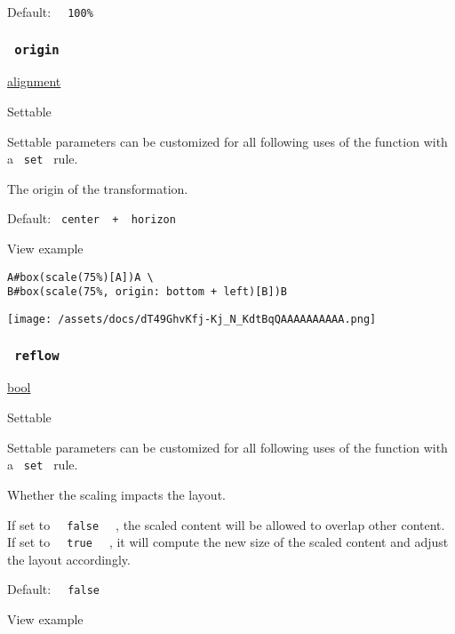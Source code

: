 Default: \texttt{\ }{\texttt{\ 100\%\ }}\texttt{\ }

\subsubsection{\texorpdfstring{\texttt{\ origin\ }}{ origin }}\label{parameters-origin}

\href{/docs/reference/layout/alignment/}{alignment}

{{ Settable }}

\label{parameters-origin-settable-tooltip}
Settable parameters can be customized for all following uses of the
function with a \texttt{\ set\ } rule.

The origin of the transformation.

Default: \texttt{\ center\ }{\texttt{\ +\ }}\texttt{\ horizon\ }


View example

\begin{verbatim}
A#box(scale(75%)[A])A \
B#box(scale(75%, origin: bottom + left)[B])B
\end{verbatim}

\texttt{[image: /assets/docs/dT49GhvKfj-Kj\_N\_KdtBqQAAAAAAAAAA.png]}

\subsubsection{\texorpdfstring{\texttt{\ reflow\ }}{ reflow }}\label{parameters-reflow}

\href{/docs/reference/foundations/bool/}{bool}

{{ Settable }}

\label{parameters-reflow-settable-tooltip}
Settable parameters can be customized for all following uses of the
function with a \texttt{\ set\ } rule.

Whether the scaling impacts the layout.

If set to \texttt{\ }{\texttt{\ false\ }}\texttt{\ } , the scaled
content will be allowed to overlap other content. If set to
\texttt{\ }{\texttt{\ true\ }}\texttt{\ } , it will compute the new size
of the scaled content and adjust the layout accordingly.

Default: \texttt{\ }{\texttt{\ false\ }}\texttt{\ }


View example

